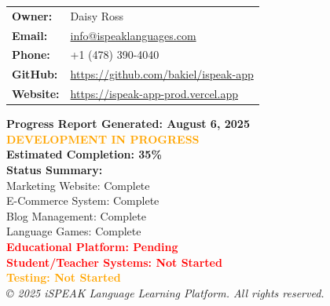 \documentclass[11pt,a4paper]{article}
\begin{document}
\begin{tcolorbox}[colback=gray!5, colframe=ispeak-gray]
\begin{tabular}{ll}
\textbf{Owner:} & Daisy Ross \\
\textbf{Email:} & \href{mailto:info@ispeaklanguages.com}{info@ispeaklanguages.com} \\
\textbf{Phone:} & +1 (478) 390-4040 \\
\textbf{GitHub:} & \url{https://github.com/bakiel/ispeak-app} \\
\textbf{Website:} & \url{https://ispeak-app-prod.vercel.app} \\
\end{tabular}
\end{tcolorbox}

\vspace{2cm}

\begin{center}
\large{\textbf{Progress Report Generated: August 6, 2025}}\\
\vspace{0.5cm}
\huge{\textcolor{orange}{\textbf{DEVELOPMENT IN PROGRESS}}}\\
\vspace{0.5cm}
\large{\textbf{Estimated Completion: 35\%}}\\
\vspace{0.5cm}
\textbf{Status Summary:}\\
Marketing Website: Complete\\
E-Commerce System: Complete\\
Blog Management: Complete\\
Language Games: Complete\\
\textcolor{red}{\textbf{Educational Platform: Pending}}\\
\textcolor{red}{\textbf{Student/Teacher Systems: Not Started}}\\
\textcolor{orange}{\textbf{Testing: Not Started}}\\
\vspace{1cm}
\textit{© 2025 iSPEAK Language Learning Platform. All rights reserved.}
\end{center}
\end{document}
